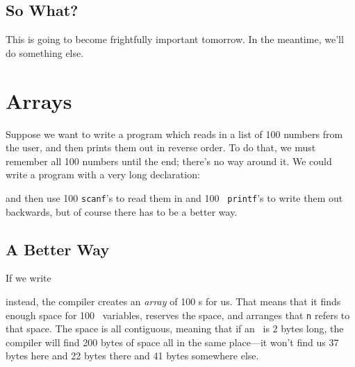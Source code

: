 \subsection{So What?}

This is going to become frightfully important tomorrow.  In the
meantime, we'll do something else.

\section{Arrays}

Suppose we want to write a program which reads in a list of 100 numbers
from the user, and then prints them out in reverse order. To do that, we
must remember all 100 numbers until the end; there's no way around it.
We could write a program with a very long declaration:

\begin{flushleft}
\verb% int main(void) % \\*
\verb% { %  \\*
\verb%   int n0, n1, n2, n3, n4, n5, n6, n7, n8, n9; % \\*
\verb%   . . . % \\*
\verb%   int n90, n91, n92, n93, n94, n95, n96, n97, n98, n99; % \\*
\verb% % \\*
\verb%   . . . % \\*
\verb% } %
\end{flushleft}

\noindent and then use 100 {\tt scanf}'s to read them in and 100 {\tt
printf}'s to write them out backwards, but of course there has to be a
better way.  

\subsection{A Better Way}

If we write

\begin{flushleft}
\verb% int n[100]; %
\end{flushleft}

\noindent instead, the compiler creates an {\em array}\/ of 100 \int s for
us.  That means that it finds enough space for 100 \int\ variables,
reserves the space, and arranges that {\tt n} refers to that space.  The
space is all contiguous, meaning that if an \int\ is 2 bytes long, the
compiler will find 200 bytes of space all in the same place---it won't
find us 37 bytes here and 22 bytes there and 41 bytes somewhere else.  

